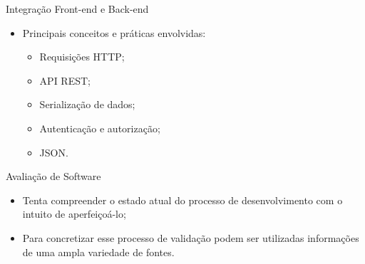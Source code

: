 \begin{frame}{Integração Front-end e Back-end}
    \begin{itemize}
        \item Principais conceitos e práticas envolvidas: \vspace{0.5cm}
              \begin{itemize}
                  \item Requisições HTTP; \vspace{0.5cm}
                  \item API REST; \vspace{0.5cm}
                  \item Serialização de dados; \vspace{0.5cm}
                  \item Autenticação e autorização; \vspace{0.5cm}
                  \item JSON. \vspace{0.5cm}
              \end{itemize}
    \end{itemize}
\end{frame}

\begin{frame}{Avaliação de Software}
    \begin{itemize}
        \item Tenta compreender o estado atual do processo de desenvolvimento com o intuito de aperfeiçoá-lo; \vspace{0.5cm}
        \item Para concretizar esse processo de validação podem ser utilizadas informações de uma ampla variedade de fontes. \vspace{0.5cm}
    \end{itemize}
\end{frame}